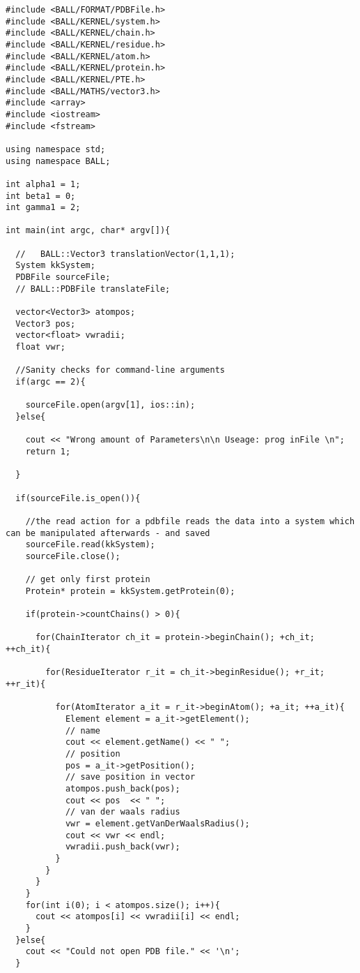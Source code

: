 \documentclass[11pt]{article}
\begin{document}
\begin{lstlisting}
#include <BALL/FORMAT/PDBFile.h>
#include <BALL/KERNEL/system.h>
#include <BALL/KERNEL/chain.h>
#include <BALL/KERNEL/residue.h>
#include <BALL/KERNEL/atom.h>
#include <BALL/KERNEL/protein.h>
#include <BALL/KERNEL/PTE.h>
#include <BALL/MATHS/vector3.h>
#include <array>
#include <iostream>
#include <fstream>

using namespace std;
using namespace BALL;

int alpha1 = 1;
int beta1 = 0;
int gamma1 = 2;

int main(int argc, char* argv[]){

  //   BALL::Vector3 translationVector(1,1,1);
  System kkSystem;
  PDBFile sourceFile;
  // BALL::PDBFile translateFile;

  vector<Vector3> atompos;
  Vector3 pos;
  vector<float> vwradii;
  float vwr;

  //Sanity checks for command-line arguments
  if(argc == 2){

    sourceFile.open(argv[1], ios::in);
  }else{

    cout << "Wrong amount of Parameters\n\n Useage: prog inFile \n";
    return 1;

  }

  if(sourceFile.is_open()){

    //the read action for a pdbfile reads the data into a system which can be manipulated afterwards - and saved
    sourceFile.read(kkSystem);
    sourceFile.close();

    // get only first protein
    Protein* protein = kkSystem.getProtein(0);

    if(protein->countChains() > 0){

      for(ChainIterator ch_it = protein->beginChain(); +ch_it; ++ch_it){

        for(ResidueIterator r_it = ch_it->beginResidue(); +r_it; ++r_it){

          for(AtomIterator a_it = r_it->beginAtom(); +a_it; ++a_it){
            Element element = a_it->getElement();
            // name
            cout << element.getName() << " ";
            // position
            pos = a_it->getPosition();
            // save position in vector
            atompos.push_back(pos);
            cout << pos  << " ";
            // van der waals radius
            vwr = element.getVanDerWaalsRadius();
            cout << vwr << endl;
            vwradii.push_back(vwr);
          }                   
        }
      }
    }
    for(int i(0); i < atompos.size(); i++){
      cout << atompos[i] << vwradii[i] << endl;
    }
  }else{
    cout << "Could not open PDB file." << '\n';
  }


\end{lstlisting}
\end{document}

